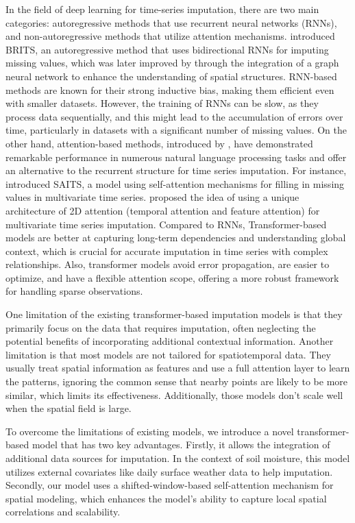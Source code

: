 \documentclass[11pt]{article}
\begin{document}
 In the field of deep learning for time-series imputation, there are two main categories: autoregressive methods that use recurrent neural networks (RNNs), and non-autoregressive methods that utilize attention mechanisms. \citet{cao2018brits} introduced BRITS, an autoregressive method that uses bidirectional RNNs for imputing missing values, which was later improved by \citet{cini2021filling} through the integration of a graph neural network to enhance the understanding of spatial structures. RNN-based methods are known for their strong inductive bias, making them efficient even with smaller datasets. However, the training of RNNs can be slow, as they process data sequentially, and this might lead to the accumulation of errors over time, particularly in datasets with a significant number of missing values. On the other hand, attention-based methods, introduced by \citet{vaswani2017attention}, have demonstrated remarkable performance in numerous natural language processing tasks and offer an alternative to the recurrent structure for time series imputation. For instance, \citet{du2023saits} introduced SAITS, a model using self-attention mechanisms for filling in missing values in multivariate time series. \citet{tashiro2021csdi} proposed the idea of using a unique architecture of 2D attention (temporal attention and feature attention) for multivariate time series imputation. Compared to RNNs, Transformer-based models are better at capturing long-term dependencies and understanding global context, which is crucial for accurate imputation in time series with complex relationships. Also, transformer models avoid error propagation, are easier to optimize, and have a flexible attention scope, offering a more robust framework for handling sparse observations. 


One limitation of the existing transformer-based imputation models is that they primarily focus on the data that requires imputation, often neglecting the potential benefits of incorporating additional contextual information. Another limitation is that most models are not tailored for spatiotemporal data. They usually treat spatial information as features and use a full attention layer to learn the patterns, ignoring the common sense that nearby points are likely to be more similar, which limits its effectiveness. Additionally, those models don't scale well when the spatial field is large.



To overcome the limitations of existing models, we introduce a novel transformer-based model that has two key advantages. Firstly, it allows the integration of additional data sources for imputation. In the context of soil moisture, this model utilizes external covariates like daily surface weather data to help imputation. Secondly, our model uses a shifted-window-based self-attention mechanism \citep{liu2021swin} for spatial modeling, which enhances the model's ability to capture local spatial correlations and scalability.
\end{document}
